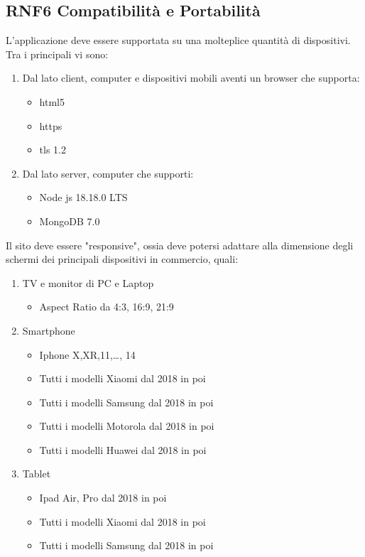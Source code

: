 \documentclass{report}
\begin{document}
\subsection*{RNF6 Compatibilità e Portabilità}
L'applicazione deve essere supportata su una molteplice quantità di dispositivi.
Tra i principali vi sono:
\begin{enumerate}
	\item Dal lato client, computer e dispositivi mobili aventi un browser che supporta:
    \begin{itemize}
		\item html5
		\item https
		\item tls 1.2
	\end{itemize}
	\item Dal lato server, computer che supporti:
	\begin{itemize}
		\item Node js 18.18.0 LTS
		\item MongoDB 7.0
	\end{itemize}
\end{enumerate}
Il sito deve essere "responsive", ossia deve potersi adattare alla dimensione degli schermi dei principali dispositivi in commercio, quali:
\begin{enumerate}
	\item TV e monitor di PC e Laptop 
	\begin{itemize}
		\item Aspect Ratio da 4:3, 16:9, 21:9
	\end{itemize}
	\item Smartphone
	\begin{itemize}
		\item Iphone X,XR,11,\dots , 14
		\item Tutti i modelli Xiaomi dal 2018 in poi 
		\item Tutti i modelli Samsung dal 2018 in poi
		\item Tutti i modelli Motorola dal 2018 in poi 
		\item Tutti i modelli Huawei dal 2018 in poi 
	\end{itemize}
	\item Tablet 
	\begin{itemize}
		\item Ipad Air, Pro dal 2018 in poi
		\item Tutti i modelli Xiaomi dal 2018 in poi
		\item Tutti i modelli Samsung dal 2018 in poi
	\end{itemize}
\end{enumerate}
\end{document}
